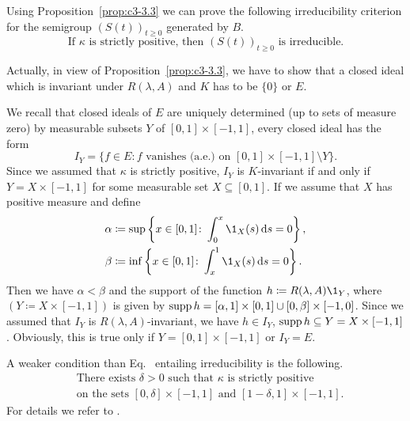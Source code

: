 \begin{examples}
\begin{enumerate}[\upshape (i), wide, labelindent=.25em]
	Using Proposition~\ref{prop:c3-3.3} we can prove the following irreducibility criterion for the semigroup $(S(t))_{t\geq 0}$ generated by $B$.
	\begin{equation}\label{eq:c3-3.7}
		\text{If } \kappa \text{ is strictly positive, then } (S(t))_{t\geq 0} \text{ is irreducible.}
	\end{equation}
	
	Actually, in view of Proposition~\ref{prop:c3-3.3}, we have to show that a closed ideal which is invariant under $R(\lambda,A)$ and $K$ has to be $\{0\}$ or $E$.
	
	We recall that closed ideals of\/ $E$ are uniquely determined (up to sets of measure zero) by measurable subsets $Y$ of\/ $[0,1]\times[-1,1]$, \ie  every closed ideal has the form
	\[
		I_{Y} = \{f \in E \colon f \text{ vanishes (a.e.) on } [0,1]\times[-1,1] \setminus Y\}.
	\]
	Since we assumed that $\kappa$ is strictly positive, $I_{Y}$ is $K$-invariant if and only if\/ $Y = X\times[-1,1]$ for some measurable set $X \subseteq [0,1]$.
	If we assume that $X$ has positive measure and define
    \begin{align*}
    \alpha & \coloneq \sup\left\{x \in [0,1] \colon \int_{0}^{x} \1_{X}(s)\ds  = 0\right\}, \\
	 \beta & \coloneq \inf\left\{x \in [0,1] \colon \int_{x}^{1} \1_{X}(s)\ds  = 0 \right\}.
    \end{align*}
	Then we have $\alpha < \beta$ and the support of the function $h \coloneq R(\lambda,A)\1_{Y}$, where 
	$(Y \coloneq X\times[-1,1])$ is given by $\mathop{}\!\mathrm{supp}\, h = [\alpha,1]\times[0,1] \cup [0,\beta]\times[-1,0]$.
	Since we assumed that $I_{Y}$ is $R(\lambda,A)$-invariant, we have $h \in I_{Y}$, \ie  $\mathop{}\!\mathrm{supp}\, h \subseteq Y = X\times[-1,1]$.
	Obviously, this is true only if\/ $Y = [0,1]\times[-1,1]$ or $I_{Y} = E$.
	
	A weaker condition than Eq.~ entailing irreducibility is the following.
	\begin{equation}\label{eq:c3-3.8}
		\begin{split}
		&\text{There exists } \delta > 0 \text{ such that } \kappa \text{ is strictly positive}\\
		&\text{on the sets } [0,\delta]\times[-1,1] \text{ and } [1-\delta,1]\times[-1,1] .
		\end{split}
	\end{equation}
	For details we refer to \textcite{greiner:1984d}.
	\end{enumerate}	
\end{examples}
